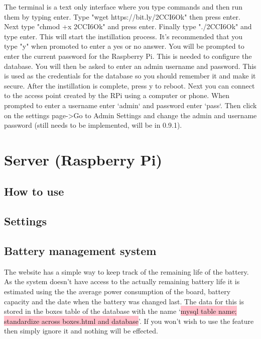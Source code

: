 \documentclass[12pt]{article}
\begin{document}
The terminal is a text only interface where you type commands and then run them by typing enter.  Type "wget https://bit.ly/2CCI6Ok" then press enter.  Next type "chmod +x 2CCI6Ok" and press enter.  Finally type "./2CCI6Ok" and type enter.  This will start the instillation process.  It's recommended that you type "y" when promoted to enter a yes or no answer.  You will be prompted to enter the current password for the Raspberry Pi.  This is needed to configure the database.  You will then be asked to enter an admin username and password.  This is used as the credentials for the database so you should remember it and make it secure.  After the instillation is complete, press y to reboot.  Next you can connect to the access point created by the RPi using a computer or phone.  When prompted to enter a username enter `admin` and password enter `pass`.  Then click on the settings page->Go to Admin Settings and change the admin and username password (still needs to be implemented, will be in 0.9.1).


\section{Server (Raspberry Pi)}
\subsection{How to use}

\subsection{Settings}

\subsection{Battery management system}
The website has a simple way to keep track of the remaining life of the battery.  As the system doesn't have access to the actually remaining battery life it is estimated using the the average power consumption of the board, battery capacity and the date when the battery was changed last.  The data for this is stored in the boxes table of the database with the name `\colorbox{pink}{mysql table name; standardize across boxes.html and database}'.  If you won't wish to use the feature then simply ignore it and nothing will be effected.\\
\end{document}
